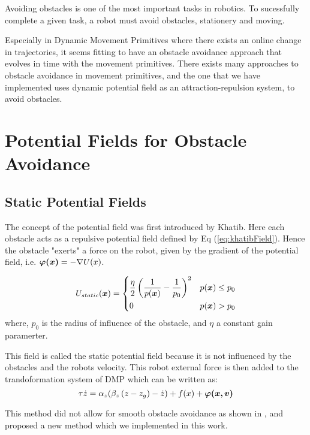 Avoiding obstacles is one of the most important tasks in robotics. To sucessfully complete 
a given task, a robot must avoid obstacles, stationery and moving.

Especially in Dynamic Movement Primitives where there exists an online change in trajectories, it seems fitting
to have an obstacle avoidance approach that evolves in time with the movement primitives. 
There exists many approaches to obstacle avoidance in movement primitives, and the one that we have implemented uses
dynamic potential field as an attraction-repulsion system, to avoid obstacles.

\section{Potential Fields for Obstacle Avoidance}
\subsection{Static Potential Fields}
The concept of the potential field was first introduced by Khatib\cite{khatibArtificial}. Here each obstacle acts as a repulsive potential field 
defined by Eq (\ref{eq:khatibField}). Hence the obstacle "exerts" a force on the robot, given by the gradient of the potential field,
i.e. $\boldsymbol{\varphi(x)} = -\nabla U(x)$.

\begin{equation}
    \label{eq:khatibField}
    U_{static}(\boldsymbol{x}) = 
    \begin{dcases}
        \frac{\displaystyle \eta}{\displaystyle 2} \left( \frac{\displaystyle 1}{\displaystyle p(\boldsymbol{x})} - \frac{\displaystyle 1}{\displaystyle p_0}\right)^2 & p(\boldsymbol{x}) \leq p_0 \\
        0 & p(\boldsymbol{x}) > p_0
    \end{dcases}
\end{equation}
where, $p_0$ is the radius of influence of the obstacle, and $\eta$ a constant gain paramerter.

This field is called the static potential field because it is not influenced by the obstacles and the robots velocity.
This robot external force is then added to the trandoformation system of DMP which can be written as:
\begin{equation}
    \tau \dot{z} = \alpha_z (\beta_z \left( z - z_g \right) - \dot{z}) + f(x) + \boldsymbol{\varphi(x,v)}
\end{equation}

This method did not allow for smooth obstacle avoidance as shown in \cite{peterOG}, and proposed a new method
which we implemented in this work.
